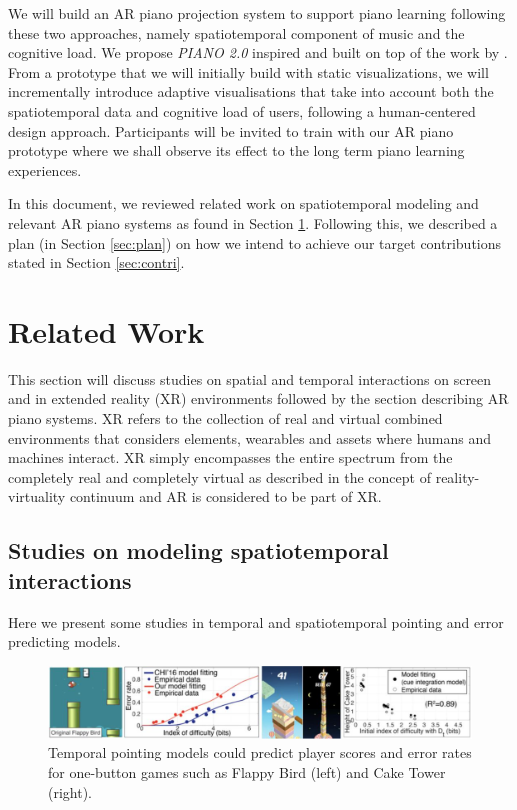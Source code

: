 \documentclass[manuscript,screen]{acmart}
\begin{document}
We will build an AR piano projection system to support piano learning following these two approaches, namely spatiotemporal component of music and the cognitive load. We propose \textit{PIANO 2.0} inspired and built on top of the work by \citet{rogers2014piano}. From a prototype that we will initially build with static visualizations, we will incrementally introduce adaptive visualisations that take into account both the spatiotemporal data and cognitive load of users, following a human-centered design approach. Participants will be invited to train with our AR piano prototype where we shall observe its effect to the long term piano learning experiences.

In this document, we reviewed related work on spatiotemporal modeling and relevant AR piano systems as found in Section \ref{sec:rrl}. Following this, we described a plan (in Section \ref{sec:plan}) on how we intend to achieve our target contributions stated in Section \ref{sec:contri}.


\section{Related Work}
\label{sec:rrl}
This section will discuss studies on spatial and temporal interactions on screen and in extended reality (XR) environments followed by the section describing AR piano systems. XR refers to the collection of real and virtual combined environments that considers elements, wearables and assets where humans and machines interact. XR simply encompasses the entire spectrum from the completely real and completely virtual as described in the concept of reality-virtuality continuum \cite{milgram1994taxonomy}  and AR is considered to be part of XR. 

\subsection{Studies on modeling spatiotemporal interactions}
Here we present some studies in temporal and spatiotemporal pointing and error predicting models. 

\begin{figure}[t]
\centering
 \includegraphics[width=12cm]{figures/flappybird.png}
    \caption{Temporal pointing models could predict player scores and error rates for one-button games such as Flappy Bird (left) and Cake Tower (right).
    }\label{fig:flappybird}
\end{figure}
\end{document}
